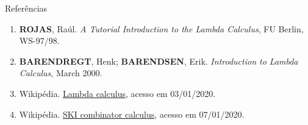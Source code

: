 \begin{frame}[fragile]{Referências}

    \begin{enumerate}
        \item \textbf{ROJAS}, Raúl. \textit{A Tutorial Introduction to the Lambda Calculus},
            FU Berlin, WS-97/98.
  
        \item \textbf{BARENDREGT}, Henk; \textbf{BARENDSEN}, Erik. \textit{Introduction to 
            Lambda Calculus}, March 2000.

        \item Wikipédia. \href{https://en.wikipedia.org/wiki/Lambda_calculus}{Lambda calculus},
            acesso em 03/01/2020. 

        \item Wikipédia. \href{https://en.wikipedia.org/wiki/SKI_combinator_calculus}{SKI
            combinator calculus}, acesso em 07/01/2020.
 
    \end{enumerate}

\end{frame}
